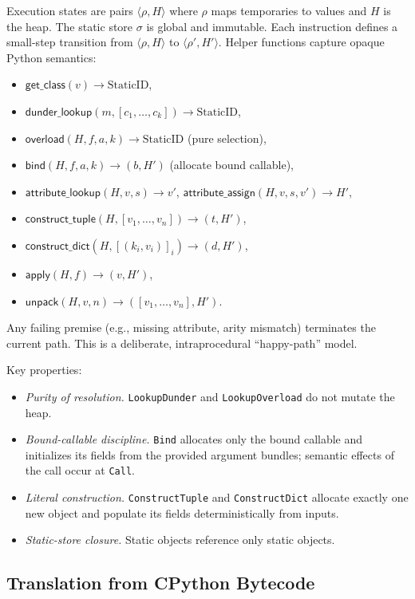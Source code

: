 Execution states are pairs $\langle \rho, H \rangle$ where $\rho$ maps temporaries to values and $H$ is the heap. The static store $\sigma$ is global and immutable. Each instruction defines a small-step transition from $\langle \rho, H \rangle$ to $\langle \rho', H' \rangle$. Helper functions capture opaque Python semantics:
\begin{itemize}
\item $\mathsf{get\_class}(v) \to \text{StaticID}$,
\item $\mathsf{dunder\_lookup}(m, [c_1,\ldots,c_k]) \to \text{StaticID}$,
\item $\mathsf{overload}(H, f, a, k) \to \text{StaticID}$ (pure selection),
\item $\mathsf{bind}(H, f, a, k) \to (b, H')$ (allocate bound callable),
\item $\mathsf{attribute\_lookup}(H, v, s) \to v'$, $\mathsf{attribute\_assign}(H, v, s, v') \to H'$,
\item $\mathsf{construct\_tuple}(H, [v_1,\ldots,v_n]) \to (t, H')$,
\item $\mathsf{construct\_dict}(H, [(k_i,v_i)]_i) \to (d, H')$,
\item $\mathsf{apply}(H, f) \to (v, H')$,
\item $\mathsf{unpack}(H, v, n) \to ([v_1,\ldots,v_n], H')$.
\end{itemize}
Any failing premise (e.g., missing attribute, arity mismatch) terminates the current path. This is a deliberate, intraprocedural ``happy-path'' model.

Key properties:
\begin{itemize}
\item \emph{Purity of resolution.} \texttt{LookupDunder\*} and \texttt{LookupOverload} do not mutate the heap.
\item \emph{Bound-callable discipline.} \texttt{Bind} allocates only the bound callable and initializes its fields from the provided argument bundles; semantic effects of the call occur at \texttt{Call}.
\item \emph{Literal construction.} \texttt{ConstructTuple} and \texttt{ConstructDict} allocate exactly one new object and populate its fields deterministically from inputs.
\item \emph{Static-store closure.} Static objects reference only static objects.
\end{itemize}

\subsection{Translation from CPython Bytecode}

